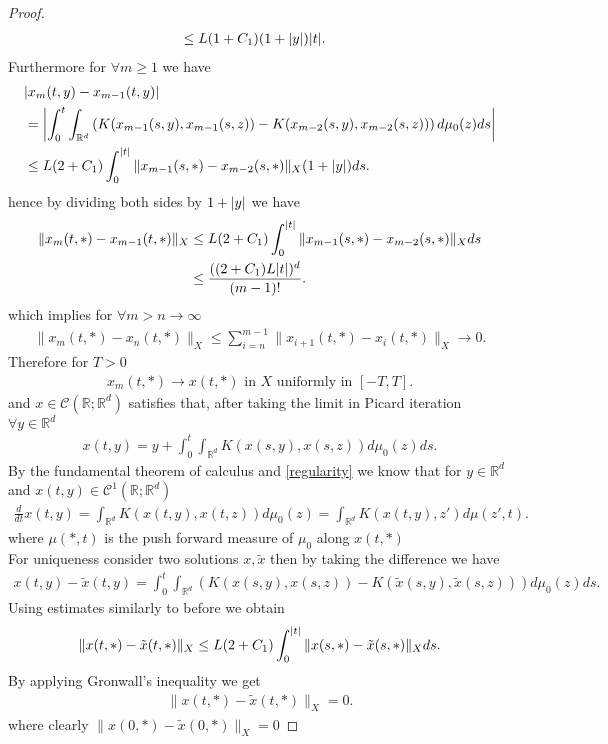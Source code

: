 \begin{proof}
\begin{align*}
                                &\le L(1+C_{1})(1+\abs{y})\abs{t}
  .\end{align*}
  Furthermore for $\forall m\ge 1$ we have 
  \begin{align*}
    &\abs{x_m(t,y) - x_{m-1}(t,y)} \\
    &= \abs*{\int_0^{t} \int_{\mathbb{R}^{d} }\left( K(x_{m-1}(s,y),x_{m-1}(s,z)) - K(x_{m-2}(s,y),x_{m-2}(s,z)) \right)d\mu_0(z)ds  }\\
    &\le L(2+C_{1})\int_0^{\abs{t}} \|x_{m-1}(s,*)-x_{m-2}(s,*)\|_X(1+\abs{y}) ds
  .\end{align*}
  hence by dividing both sides by $1 + \abs{y}$ we have 
  \begin{align*}
    \|x_m(t,*) - x_{m-1}(t,*)\|_X &\le L(2+C_{1})\int_0^{\abs{t}}  \|x_{m-1}(s,*) - x_{m-2}(s,*)\|_X ds\\
                                  &\le \frac{((2+C_{1})L \abs{t})^{d} }{(m-1)!}
  .\end{align*}
  which implies for $\forall m > n \to \infty$ 
  \begin{align*}
    \|x_m(t,*) - x_n(t,*)\|_X \le  \sum_{i=n}^{m-1} \|x_{i+1}(t,*) - x_i(t,*)\|_X \to  0
  .\end{align*}
  Therefore for $T > 0 $ 
  \begin{align*}
    x_m(t,*) \to x(t,*) \text{ in } X \text{ uniformly in } [-T,T]
  .\end{align*}
  and $x \in  \mathcal{C}(\mathbb{R};\mathbb{R}^{d}  )$ satisfies that, after taking the limit in Picard iteration $\forall y \in  \mathbb{R}^{d} $
  \begin{align*}
    x(t,y) = y + \int_0^{t} \int_{\mathbb{R}^{d} } K(x(s,y),x(s,z)) d\mu_0(z) ds
  .\end{align*}
  By the fundamental theorem of calculus and \autoref{regularity} we know that for $y \in  \mathbb{R}^{d} $ and $x(t,y) \in  \mathcal{C}^{1}(\mathbb{R};\mathbb{R}^{d} ) $
  \begin{align*}
    \frac{d}{dt} x(t,y) = \int_{\mathbb{R}^{d} } K(x(t,y),x(t,z)) d\mu_0(z) = \int_{\mathbb{R}^{d} }K(x(t,y),z')d\mu(z',t)
  .\end{align*}
  where $\mu(*,t)$ is the push forward measure of $\mu_0$ along $x(t,*)$\\[1ex]
  For uniqueness consider two solutions $x,\tilde{x} $ then by taking the difference we have 
  \begin{align*}
    x(t,y) - \tilde{x}(t,y)  = \int_0^{t} \int_{\mathbb{R}^{d} } \left( K(x(s,y),x(s,z)) - K(\tilde{x}(s,y),\tilde{x}(s,z)  )\right)  d\mu_0(z)ds
  .\end{align*}
  Using estimates similarly to before  we obtain 
  \begin{align*}
    \|x(t,*)-\tilde{x}(t,*) \|_X \le L(2+C_{1})\int_0^{\abs{t}} \|x(s,*)-\tilde{x}(s,*) \|_X ds 
  .\end{align*}
  By applying Gronwall's inequality we get 
  \begin{align*}
    \|x(t,*) - \tilde{x}(t,*) \|_X = 0
  .\end{align*}
  where clearly $\|x(0,*) - \tilde{x}(0,*) \|_X = 0$
\end{proof}
